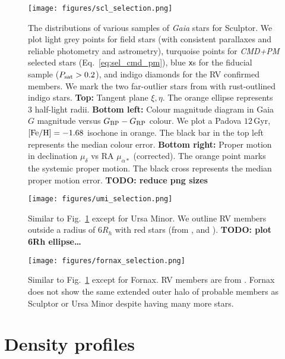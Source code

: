 \begin{figure}
\centering
\texttt{[image: figures/scl\_selection.png]}
\caption[Sculptor sample selection]{The distributions of various samples
of \emph{Gaia} stars for Sculptor. We plot light grey points for field
stars (with consistent parallaxes and reliable photometry and
astrometry), turquoise points for \emph{CMD+PM} selected stars
(Eq.~\ref{eq:sel_cmd_pm}), blue \texttt{x}s for the fiducial sample
(\(P_{\rm sat} > 0.2\)), and indigo diamonds for the RV confirmed
members. We mark the two far-outlier stars from \citet{sestito+2023a}
with rust-outlined indigo stars. \textbf{Top:} Tangent plane
\(\xi, \eta\). The orange ellipse represents 3 half-light radii.
\textbf{Bottom left:} Colour magnitude diagram in Gaia \(G\) magnitude
versus \(G_{\rm BP} - G_{\rm RP}\) colour. We plot a Padova \(12\,\)Gyr,
\({\rm [Fe/H] }=-1.68\) isochone in orange. The black bar in the top
left represents the median colour error. \textbf{Bottom right:} Proper
motion in declination \(\mu_\delta\) vs RA \(\mu_{\alpha*}\)
(corrected). The orange point marks the systemic \citet{MV2020b} proper
motion. The black cross represents the median proper motion error.
\textbf{TODO: reduce png sizes}}\label{fig:scl_selection}
\end{figure}

\begin{figure}
\centering
\texttt{[image: figures/umi\_selection.png]}
\caption[Ursa Minor sample selection]{Similar to
Fig.~\ref{fig:scl_selection} except for Ursa Minor. We outline RV
members outside a radius of \(6R_h\) with red stars (from
\citet{sestito+2023b}, \citet{pace+2020} and \citet{spencer+2018}).
\textbf{TODO: plot 6Rh ellipse\ldots{}}}\label{fig:umi_selection}
\end{figure}

\begin{figure}
\centering
\texttt{[image: figures/fornax\_selection.png]}
\caption[Fornax sample selection]{Similar to
Fig.~\ref{fig:scl_selection} except for Fornax. RV members are from
\citet{WMO2009}. Fornax does not show the same extended outer halo of
probable members as Sculptor or Ursa Minor despite having many more
stars.}\label{fig:fornax_selection}
\end{figure}

\section{Density profiles}\label{density-profiles}

